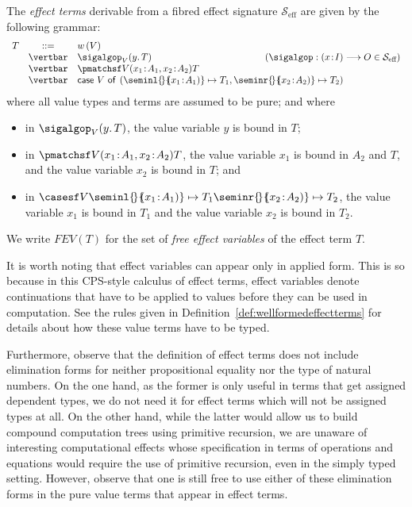\begin{definition}
\label{def:fibeffectterms}
The \emph{effect terms} derivable from a fibred effect signature $\mathcal{S}_{\text{eff}}$ are given by the following grammar:
\[
\begin{array}{r c l @{\qquad\qquad\qquad\quad}l}
T & ::= & w\, (V) &
\\
& \vertbar & \sigalgop_V(y .\, T) & (\sigalgop : (x \!:\! I) \longrightarrow O \in \mathcal{S}_{\text{eff}})
\\
& \vertbar & \pmatchsf V {(x_1 \!:\! A_1, x_2 \!:\! A_2)} {} T
\\
& \vertbar & \multicolumn{2}{l}{\mathsf{case~} V \mathsf{~of}_{} \mathsf{~} ({\seminl {\!} {\!\!(x_1 \!:\! A_1)} \mapsto T_1}, {\seminr {\!} {\!\!(x_2 \!:\! A_2)} \mapsto T_2})}
\end{array}
\]
where all value types and terms are assumed to be pure; and where
\begin{itemize}
\item in $\sigalgop_V(y .\, T)$, the value variable $y$ is bound in $T$;
\item in $\pmatchsf V {(x_1 \!:\! A_1, x_2 \!:\! A_2)} {} T$, the value variable $x_1$ is bound in $A_2$ and $T$, and the value variable $x_2$ is bound in $T$; and
\item in $\casesf V {} {\seminl {\!} {\!\!(x_1 \!:\! A_1)} \mapsto T_1} {\seminr {\!} {\!\!(x_2 \!:\! A_2)} \mapsto T_2}$, the value variable $x_1$ is bound in $T_1$ and the value variable $x_2$ is bound in $T_2$.
\end{itemize}
\end{definition}

We write $F\!EV(T)$ for the set of \emph{free effect variables} of the effect term $T$.

It is worth noting that effect variables can appear only in applied form. This is so because in this CPS-style calculus of effect terms, effect variables denote continuations that have to be applied to values before they can be used in computation. See the rules given in Definition~\ref{def:wellformedeffectterms} for details about how these value terms have to be typed.

Furthermore, observe that the definition of effect terms does not include elimination forms for neither propositional equality nor the type of natural numbers. On the one hand, as the former is only useful in  terms that get assigned dependent types, we do not need it for effect terms which will not be assigned types at all. On the other hand, while the latter would allow us to build compound computation trees using primitive recursion, we are unaware of interesting computational effects whose specification in terms of operations and equations would require the use of primitive recursion, even in the simply typed setting. However, observe that one is still free to use either of these elimination forms in the pure value terms  that appear in effect terms. 

